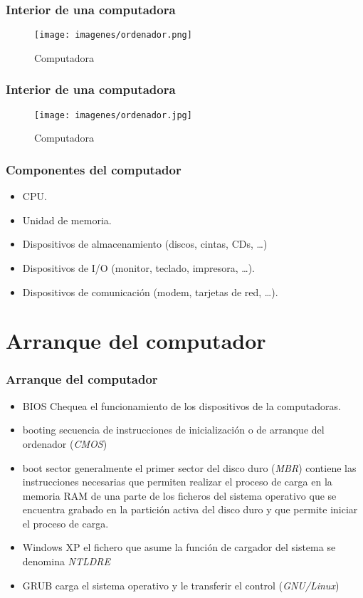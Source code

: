 \documentclass{beamer}
\begin{document}
\begin{frame}
\frametitle{Interior de una computadora} 
\begin{figure}
\texttt{[image: imagenes/ordenador.png]} 
\caption{Computadora}
\end{figure} 
\end{frame}

\begin{frame}
\frametitle{Interior de una computadora} 
\begin{figure}
\texttt{[image: imagenes/ordenador.jpg]} 
\caption{Computadora}
\end{figure} 
\end{frame}

\begin{frame} 
\frametitle{Componentes del computador}
\begin{itemize}[<+->]
\item CPU.
\item Unidad de memoria.
\item Dispositivos de almacenamiento (discos, cintas, CDs, \dots)
\item Dispositivos de I/O (monitor, teclado, impresora, \dots).
\item Dispositivos de comunicación (modem, tarjetas de red, \dots).
\end{itemize} 
\end{frame}


\section{Arranque del computador}

\begin{frame} 
\frametitle{Arranque del computador}
\begin{itemize}[<+->]
\item \alert{BIOS} Chequea el funcionamiento de los dispositivos de la computadoras.
\item \alert{booting} secuencia de instrucciones de inicialización o de arranque del ordenador (\emph{CMOS})
\item \alert{boot sector} generalmente el primer sector del disco duro (\emph{MBR}) contiene las instrucciones necesarias que permiten realizar el proceso de carga en la memoria RAM de una parte de los ficheros del sistema operativo que se encuentra grabado en la partición activa del disco duro y que permite iniciar el proceso de carga.
\item \alert{Windows XP} el fichero que asume la función de cargador del sistema se denomina \emph{NTLDRE}
\item \alert{GRUB} carga el sistema operativo y le transferir el control (\emph{GNU/Linux})
\end{itemize} 
\end{frame}
\end{document}
